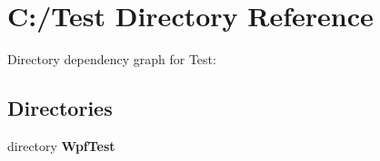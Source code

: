 \section{C\-:/\-Test Directory Reference}
\label{dir_6d5c217c9eae548e9081888f919d6b07}
Directory dependency graph for Test\-:
\subsection*{Directories}
\begin{DoxyCompactItemize}
\item 
directory {\bf Wpf\-Test}
\end{DoxyCompactItemize}
